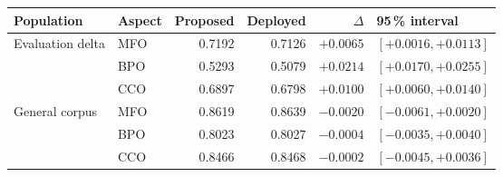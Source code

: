 \begin{tabular}{llrrrl}
\toprule
    \textbf{Population} & \textbf{Aspect} & \textbf{Proposed} & \textbf{Deployed} & \textbf{$\Delta$} & \textbf{95\,\% interval} \\
\midrule
    Evaluation delta & MFO & 0.7192 & 0.7126 & $\mathbf{+0.0065}$ & $[+0.0016, +0.0113]$ \\
     & BPO & 0.5293 & 0.5079 & $\mathbf{+0.0214}$ & $[+0.0170, +0.0255]$ \\
     & CCO & 0.6897 & 0.6798 & $\mathbf{+0.0100}$ & $[+0.0060, +0.0140]$ \\
\midrule
    General corpus & MFO & 0.8619 & 0.8639 & $-0.0020$ & $[-0.0061, +0.0020]$ \\
     & BPO & 0.8023 & 0.8027 & $-0.0004$ & $[-0.0035, +0.0040]$ \\
     & CCO & 0.8466 & 0.8468 & $-0.0002$ & $[-0.0045, +0.0036]$ \\
\bottomrule
\end{tabular}
